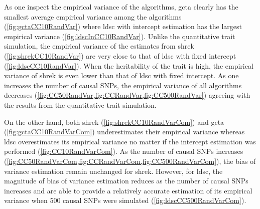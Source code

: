 		As one inspect the empirical variance of the algorithms, \gls{gcta} clearly has the smallest average empirical variance among the algorithms (\cref{fig:gctaCC10RandVar}) where \gls{ldsc} with intercept estimation has the largest empirical variance (\cref{fig:ldscInCC10RandVar}). 
		Unlike the quantitative trait simulation, the empirical variance of the estimates from \gls{shrek} (\cref{fig:shrekCC10RandVar}) are very close to that of \gls{ldsc} with fixed intercept (\cref{fig:ldscCC10RandVar}).
		When the heritability of the trait is high, the empirical variance of \gls{shrek} is even lower than that of \gls{ldsc} with fixed intercept. 
		As one increases the number of causal \glspl{SNP}, the empirical variance of all algorithms decreases (\cref{fig:CC50RandVar,fig:CCRandVar,fig:CC500RandVar}) agreeing with the results from the quantitative trait simulation.
		
		On the other hand, both \gls{shrek} (\cref{fig:shrekCC10RandVarCom}) and \gls{gcta} (\cref{fig:gctaCC10RandVarCom}) underestimates their empirical variance whereas \gls{ldsc} overestimates its empirical variance no matter if the intercept estimation was performed  (\cref{fig:CC10RandVarCom}).
		As the number of causal \glspl{SNP} increases (\cref{fig:CC50RandVarCom,fig:CCRandVarCom,fig:CC500RandVarCom}), the bias of variance estimation remain unchanged for \gls{shrek}. 
		However, for \gls{ldsc}, the magnitude of bias of variance estimation reduces as the number of causal \glspl{SNP} increases and are able to provide a relatively accurate estimation of its empirical variance when 500 causal \glspl{SNP} were simulated (\cref{fig:ldscCC500RandVarCom}).
		
